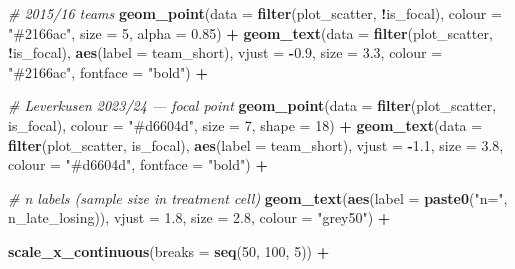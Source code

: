 \documentclass[
]{article}
\newenvironment{Shaded}{\begin{snugshade}}{\end{snugshade}}
\newcommand{\AttributeTok}[1]{\textcolor[rgb]{0.13,0.29,0.53}{#1}}
\newcommand{\CommentTok}[1]{\textcolor[rgb]{0.56,0.35,0.01}{\textit{#1}}}
\newcommand{\DecValTok}[1]{\textcolor[rgb]{0.00,0.00,0.81}{#1}}
\newcommand{\FloatTok}[1]{\textcolor[rgb]{0.00,0.00,0.81}{#1}}
\newcommand{\FunctionTok}[1]{\textcolor[rgb]{0.13,0.29,0.53}{\textbf{#1}}}
\newcommand{\NormalTok}[1]{#1}
\newcommand{\SpecialCharTok}[1]{\textcolor[rgb]{0.81,0.36,0.00}{\textbf{#1}}}
\newcommand{\StringTok}[1]{\textcolor[rgb]{0.31,0.60,0.02}{#1}}
\begin{document}
\begin{Shaded}
\begin{Highlighting}[]
  \CommentTok{\# 2015/16 teams}
  \FunctionTok{geom\_point}\NormalTok{(}\AttributeTok{data =} \FunctionTok{filter}\NormalTok{(plot\_scatter, }\SpecialCharTok{!}\NormalTok{is\_focal),}
             \AttributeTok{colour =} \StringTok{"\#2166ac"}\NormalTok{, }\AttributeTok{size =} \DecValTok{5}\NormalTok{, }\AttributeTok{alpha =} \FloatTok{0.85}\NormalTok{) }\SpecialCharTok{+}
  \FunctionTok{geom\_text}\NormalTok{(}\AttributeTok{data  =} \FunctionTok{filter}\NormalTok{(plot\_scatter, }\SpecialCharTok{!}\NormalTok{is\_focal),}
            \FunctionTok{aes}\NormalTok{(}\AttributeTok{label =}\NormalTok{ team\_short),}
            \AttributeTok{vjust =} \SpecialCharTok{{-}}\FloatTok{0.9}\NormalTok{, }\AttributeTok{size =} \FloatTok{3.3}\NormalTok{,}
            \AttributeTok{colour =} \StringTok{"\#2166ac"}\NormalTok{, }\AttributeTok{fontface =} \StringTok{"bold"}\NormalTok{) }\SpecialCharTok{+}
  
  \CommentTok{\# Leverkusen 2023/24 — focal point}
  \FunctionTok{geom\_point}\NormalTok{(}\AttributeTok{data =} \FunctionTok{filter}\NormalTok{(plot\_scatter, is\_focal),}
             \AttributeTok{colour =} \StringTok{"\#d6604d"}\NormalTok{, }\AttributeTok{size =} \DecValTok{7}\NormalTok{, }\AttributeTok{shape =} \DecValTok{18}\NormalTok{) }\SpecialCharTok{+}
  \FunctionTok{geom\_text}\NormalTok{(}\AttributeTok{data  =} \FunctionTok{filter}\NormalTok{(plot\_scatter, is\_focal),}
            \FunctionTok{aes}\NormalTok{(}\AttributeTok{label =}\NormalTok{ team\_short),}
            \AttributeTok{vjust =} \SpecialCharTok{{-}}\FloatTok{1.1}\NormalTok{, }\AttributeTok{size =} \FloatTok{3.8}\NormalTok{,}
            \AttributeTok{colour =} \StringTok{"\#d6604d"}\NormalTok{, }\AttributeTok{fontface =} \StringTok{"bold"}\NormalTok{) }\SpecialCharTok{+}
  
  \CommentTok{\# n labels (sample size in treatment cell)}
  \FunctionTok{geom\_text}\NormalTok{(}\FunctionTok{aes}\NormalTok{(}\AttributeTok{label =} \FunctionTok{paste0}\NormalTok{(}\StringTok{"n="}\NormalTok{, n\_late\_losing)),}
            \AttributeTok{vjust  =} \FloatTok{1.8}\NormalTok{, }\AttributeTok{size =} \FloatTok{2.8}\NormalTok{,}
            \AttributeTok{colour =} \StringTok{"grey50"}\NormalTok{) }\SpecialCharTok{+}
  
  \FunctionTok{scale\_x\_continuous}\NormalTok{(}\AttributeTok{breaks =} \FunctionTok{seq}\NormalTok{(}\DecValTok{50}\NormalTok{, }\DecValTok{100}\NormalTok{, }\DecValTok{5}\NormalTok{)) }\SpecialCharTok{+}
  

\end{Highlighting}
\end{Shaded}
\end{document}
